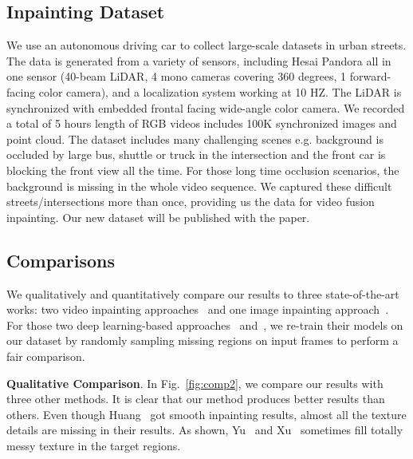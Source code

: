 \documentclass[runningheads]{llncs}
\begin{document}
\subsection{Inpainting Dataset}

We use an autonomous driving car to collect large-scale datasets in urban streets. The data is generated from a variety of sensors, including Hesai Pandora all in one sensor (40-beam LiDAR, 4 mono cameras covering 360 degrees, 1 forward-facing color camera), and a localization system working at 10 HZ. The LiDAR is synchronized with embedded frontal facing wide-angle color camera. We recorded a total of 5 hours length of RGB videos includes 100K synchronized  images and point cloud. The dataset includes many challenging scenes e.g. background is occluded by large bus, shuttle or truck in the intersection and the front car is blocking the front view all the time. For those long time occlusion scenarios, the background is missing in the whole video sequence. We captured these difficult streets/intersections more than once, providing us the data for video fusion inpainting. Our new dataset will be published with the paper.

\subsection{Comparisons}

We qualitatively and quantitatively compare our results to three state-of-the-art works: two video inpainting approaches~\cite{Xu_2019_CVPR, Huang-SigAsia-2016} and one image inpainting approach~\cite{yu2018generative}. For those two deep learning-based approaches~\cite{Xu_2019_CVPR} and~\cite{yu2018generative}, we re-train their models on our dataset by randomly sampling missing regions on input frames to perform a fair comparison.
















\textbf{Qualitative Comparison}. In Fig.~\ref{fig:comp2}, we compare our results with three other methods. It is clear that our method produces better results than others. Even though Huang~\cite{Huang-SigAsia-2016} got smooth inpainting results, almost all the texture details are missing in their results. As shown, Yu~\cite{yu2018generative} and Xu~\cite{Xu_2019_CVPR} sometimes fill totally messy texture in the target regions.
\end{document}
